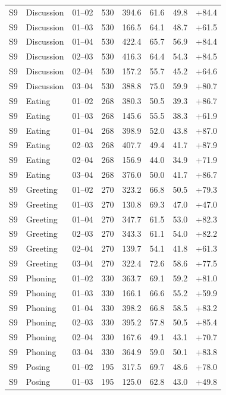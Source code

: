 \begin{center}
{\begin{longtable}{llrrrrrr}
S9 & Discussion & 01--02 & 530 & 394.6 & 61.6 & 49.8 & +84.4 \\
S9 & Discussion & 01--03 & 530 & 166.5 & 64.1 & 48.7 & +61.5 \\
S9 & Discussion & 01--04 & 530 & 422.4 & 65.7 & 56.9 & +84.4 \\
S9 & Discussion & 02--03 & 530 & 416.3 & 64.4 & 54.3 & +84.5 \\
S9 & Discussion & 02--04 & 530 & 157.2 & 55.7 & 45.2 & +64.6 \\
S9 & Discussion & 03--04 & 530 & 388.8 & 75.0 & 59.9 & +80.7 \\
S9 & Eating & 01--02 & 268 & 380.3 & 50.5 & 39.3 & +86.7 \\
S9 & Eating & 01--03 & 268 & 145.6 & 55.5 & 38.3 & +61.9 \\
S9 & Eating & 01--04 & 268 & 398.9 & 52.0 & 43.8 & +87.0 \\
S9 & Eating & 02--03 & 268 & 407.7 & 49.4 & 41.7 & +87.9 \\
S9 & Eating & 02--04 & 268 & 156.9 & 44.0 & 34.9 & +71.9 \\
S9 & Eating & 03--04 & 268 & 376.0 & 50.0 & 41.7 & +86.7 \\
S9 & Greeting & 01--02 & 270 & 323.2 & 66.8 & 50.5 & +79.3 \\
S9 & Greeting & 01--03 & 270 & 130.8 & 69.3 & 47.0 & +47.0 \\
S9 & Greeting & 01--04 & 270 & 347.7 & 61.5 & 53.0 & +82.3 \\
S9 & Greeting & 02--03 & 270 & 343.3 & 61.1 & 54.0 & +82.2 \\
S9 & Greeting & 02--04 & 270 & 139.7 & 54.1 & 41.8 & +61.3 \\
S9 & Greeting & 03--04 & 270 & 322.4 & 72.6 & 58.6 & +77.5 \\
S9 & Phoning & 01--02 & 330 & 363.7 & 69.1 & 59.2 & +81.0 \\
S9 & Phoning & 01--03 & 330 & 166.1 & 66.6 & 55.2 & +59.9 \\
S9 & Phoning & 01--04 & 330 & 398.2 & 66.8 & 58.5 & +83.2 \\
S9 & Phoning & 02--03 & 330 & 395.2 & 57.8 & 50.5 & +85.4 \\
S9 & Phoning & 02--04 & 330 & 167.6 & 49.1 & 43.1 & +70.7 \\
S9 & Phoning & 03--04 & 330 & 364.9 & 59.0 & 50.1 & +83.8 \\
S9 & Posing & 01--02 & 195 & 317.5 & 69.7 & 48.6 & +78.0 \\
S9 & Posing & 01--03 & 195 & 125.0 & 62.8 & 43.0 & +49.8 \\

\end{longtable}}
\end{center}
